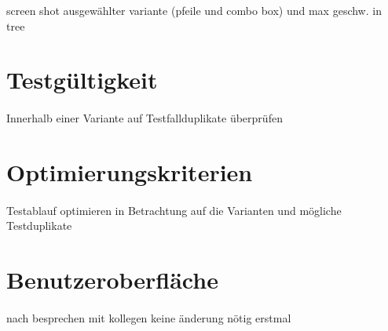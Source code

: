 screen shot ausgewählter variante (pfeile und combo box) und max geschw. in tree \\

\newpage
\section{Testgültigkeit}
\paragraph{}
Innerhalb einer Variante auf Testfallduplikate überprüfen

\newpage
\section{Optimierungskriterien}
\paragraph{}
Testablauf optimieren in Betrachtung auf die Varianten und mögliche Testduplikate

\newpage
\section{Benutzeroberfläche}
\paragraph{}


nach besprechen mit kollegen keine änderung nötig erstmal \\